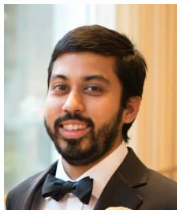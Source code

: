 \documentclass[
journal=jacsat, %
manuscript=article]{achemso}
\begin{document}
\begin{abstract}

\end{abstract}
\newpage
\begin{figure}[H]
\centering
\includegraphics[scale=.65]{Capture.PNG}
\label{fig:1}
\end{figure}
\end{document}
